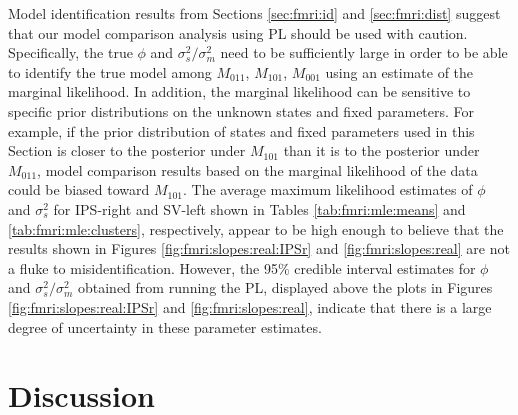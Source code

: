 
Model identification results from Sections \ref{sec:fmri:id} and \ref{sec:fmri:dist} suggest that our model comparison analysis using PL should be used with caution. Specifically, the true $\phi$ and $\sigma^2_s / \sigma^2_m$ need to be sufficiently large in order to be able to identify the true model among $M_{011}$, $M_{101}$, $M_{001}$ using an estimate of the marginal likelihood. In addition, the marginal likelihood can be sensitive to specific prior distributions on the unknown states and fixed parameters. For example, if the prior distribution of states and fixed parameters used in this Section is closer to the posterior under $M_{101}$ than it is to the posterior under $M_{011}$, model comparison results based on the marginal likelihood of the data could be biased toward $M_{101}$. The average maximum likelihood estimates of $\phi$ and $\sigma^2_s$ for IPS-right and SV-left shown in Tables \ref{tab:fmri:mle:means} and \ref{tab:fmri:mle:clusters}, respectively, appear to be high enough to believe that the results shown in Figures \ref{fig:fmri:slopes:real:IPSr} and \ref{fig:fmri:slopes:real} are not a fluke to misidentification. However, the 95\% credible interval estimates for $\phi$ and $\sigma^2_s / \sigma^2_m$ obtained from running the PL, displayed above the plots in Figures \ref{fig:fmri:slopes:real:IPSr} and \ref{fig:fmri:slopes:real}, indicate that there is a large degree of uncertainty in these parameter estimates.

\section{Discussion \label{sec:fmri:discussion}}

